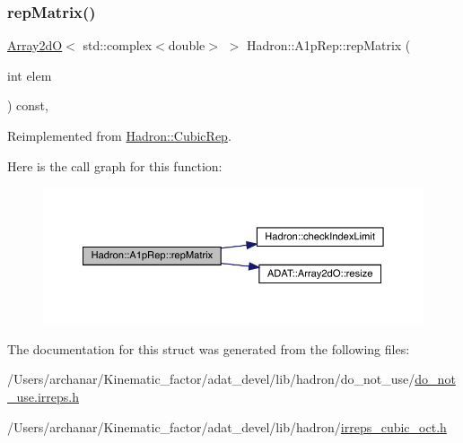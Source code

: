 \subsubsection{\texorpdfstring{repMatrix()}{repMatrix()}\hspace{0.1cm}{\footnotesize\ttfamily [2/2]}}
{\footnotesize\ttfamily \mbox{\hyperlink{classADAT_1_1Array2dO}{Array2dO}}$<$ std\+::complex$<$double$>$ $>$ Hadron\+::\+A1p\+Rep\+::rep\+Matrix (\begin{DoxyParamCaption}\item[{int}]{elem }\end{DoxyParamCaption}) const\hspace{0.3cm}{\ttfamily [inline]}, {\ttfamily [virtual]}}



Reimplemented from \mbox{\hyperlink{structHadron_1_1CubicRep_ac5d7e9e6f4ab1158b5fce3e4ad9e8005}{Hadron\+::\+Cubic\+Rep}}.

Here is the call graph for this function\+:
\nopagebreak
\begin{figure}[H]
\begin{center}
\leavevmode
\includegraphics[width=350pt]{da/dc7/structHadron_1_1A1pRep_a23b801cc71ff71d666e68a3c065d3fae_cgraph}
\end{center}
\end{figure}


The documentation for this struct was generated from the following files\+:\begin{DoxyCompactItemize}
\item 
/\+Users/archanar/\+Kinematic\+\_\+factor/adat\+\_\+devel/lib/hadron/do\+\_\+not\+\_\+use/\mbox{\hyperlink{do__not__use_8irreps_8h}{do\+\_\+not\+\_\+use.\+irreps.\+h}}\item 
/\+Users/archanar/\+Kinematic\+\_\+factor/adat\+\_\+devel/lib/hadron/\mbox{\hyperlink{lib_2hadron_2irreps__cubic__oct_8h}{irreps\+\_\+cubic\+\_\+oct.\+h}}\end{DoxyCompactItemize}
